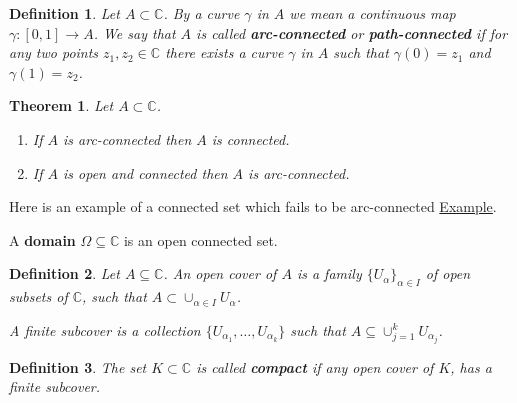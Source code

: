 \documentclass{amsart}
\newtheorem{thm}{Theorem}
\newtheorem{mydef}{Definition}
\begin{document}
\begin{mydef}
Let \(A\subset \mathbb{C}\). By a curve \(\gamma\) in \(A\) we mean a continuous map \(\gamma:[0,1]\to A\). We say that \(A\) is called \textbf{arc-connected} or \textbf{path-connected} if for any
two points \(z_1, z_2 \in \mathbb{C}\) there exists a curve \(\gamma\) in \(A\) such that \(\gamma(0) = z_1\) and \(\gamma(1) = z_2\).
\end{mydef}


\begin{thm}
Let \(A\subset \mathbb{C}\).
\begin{enumerate}
\item If \(A\) is arc-connected then \(A\) is connected.
\item If \(A\) is open and connected then \(A\) is arc-connected.
\end{enumerate}
\end{thm}

Here is an example of a connected set which fails to be arc-connected \href{https://en.wikipedia.org/wiki/Topologist\%27s\_sine\_curve}{Example}.

A \textbf{domain} \(\Omega \subseteq \mathbb{C}\) is an open connected set.


\begin{mydef}
Let \(A\subseteq \mathbb{C}\). An open cover of \(A\) is a family  \(\{U_{\alpha}\}_{\alpha \in I}\) of open subsets of \(\mathbb{C}\), such that \(A\subset \cup_{\alpha\in I} U_{\alpha}\). 

A finite subcover is a collection \(\{ U_{\alpha_1},\ldots, U_{\alpha_k}\}\) such that \(A \subseteq \cup_{j=1}^k U_{\alpha_j}\).
\end{mydef}

\begin{mydef}
The set \(K\subset \mathbb{C}\) is called \textbf{compact} if any open cover of \(K\), has a finite subcover.
\end{mydef}
\end{document}
